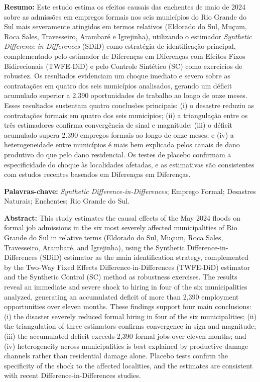 \documentclass[a4paper,12pt]{article}
\begin{document}
\vspace{1.4em}

\noindent\textbf{Resumo:} Este estudo estima os efeitos causais das enchentes de maio
de 2024 sobre as admissões em empregos formais nos seis municípios do Rio Grande do
Sul mais severamente atingidos em termos relativos (Eldorado do Sul, Muçum, Roca
Sales, Travesseiro, Arambaré e Igrejinha), utilizando o estimador \textit{Synthetic
Difference-in-Differences} (SDiD) como estratégia de identificação principal,
complementado pelo estimador de Diferenças em Diferenças com Efeitos Fixos
Bidirecionais (TWFE-DiD) e pelo Controle Sintético (SC) como exercícios de robustez.
Os resultados evidenciam um choque imediato e severo sobre as contratações em quatro
dos seis municípios analisados, gerando um déficit acumulado superior a 2.390
oportunidades de trabalho ao longo de onze meses. Esses resultados sustentam quatro
conclusões principais: (i) o desastre reduziu as contratações formais em quatro dos seis
municípios; (ii) a triangulação entre os três estimadores confirma convergência de sinal
e magnitude; (iii) o déficit acumulado supera 2.390 empregos formais ao longo de onze
meses; e (iv) a heterogeneidade entre municípios é mais bem explicada pelos canais de
dano produtivo do que pelo dano residencial. Os testes de placebo confirmam a
especificidade do choque às localidades afetadas, e as estimativas são consistentes com
estudos recentes baseados em Diferenças em Diferenças.

\vspace{0.6em}
\noindent\textbf{Palavras-chave:} \textit{Synthetic Difference-in-Differences}; Emprego
Formal; Desastres Naturais; Enchentes; Rio Grande do Sul.

\vspace{1em}

\noindent\textbf{Abstract:} This study estimates the causal effects of the May 2024
floods on formal job admissions in the six most severely affected municipalities of Rio
Grande do Sul in relative terms (Eldorado do Sul, Muçum, Roca Sales, Travesseiro,
Arambaré, and Igrejinha), using the Synthetic Difference-in-Differences (SDiD)
estimator as the main identification strategy, complemented by the Two-Way Fixed
Effects Difference-in-Differences (TWFE-DiD) estimator and the Synthetic Control (SC)
method as robustness exercises. The results reveal an immediate and severe shock to hiring in four of the six
municipalities analyzed, generating an accumulated deficit of more than 2,390
employment opportunities over eleven months. These findings support four main
conclusions: (i) the disaster severely reduced formal hiring in four of the six
municipalities; (ii) the triangulation of three estimators confirms convergence in sign
and magnitude; (iii) the accumulated deficit exceeds 2,390 formal jobs over eleven
months; and (iv) heterogeneity across municipalities is best explained by productive
damage channels rather than residential damage alone. Placebo tests confirm the
specificity of the shock to the affected localities, and the estimates are consistent
with recent Difference-in-Differences studies.
\end{document}
